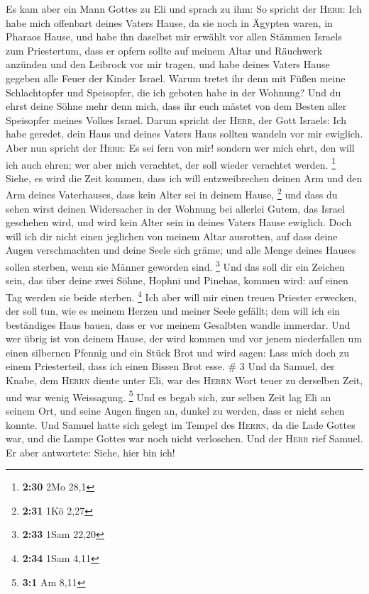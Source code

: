  Es kam aber ein Mann Gottes zu Eli und sprach zu ihm: So
spricht der \textsc{Herr}: Ich habe mich offenbart deines Vaters Hause,
da sie noch in Ägypten waren, in Pharaos Hause,  und habe
ihn daselbst mir erwählt vor allen Stämmen Israels zum Priestertum, dass
er opfern sollte auf meinem Altar und Räuchwerk anzünden und den
Leibrock vor mir tragen, und habe deines Vaters Hause gegeben alle Feuer
der Kinder Israel.  Warum tretet ihr denn mit Füßen meine
Schlachtopfer und Speisopfer, die ich geboten habe in der Wohnung? Und
du ehrst deine Söhne mehr denn mich, dass ihr euch mästet von dem Besten
aller Speisopfer meines Volkes Israel.  Darum spricht der
\textsc{Herr}, der Gott Israels: Ich habe geredet, dein Haus und deines
Vaters Haus sollten wandeln vor mir ewiglich. Aber nun spricht der
\textsc{Herr}: Es sei fern von mir! sondern wer mich ehrt, den will ich
auch ehren; wer aber mich verachtet, der soll wieder verachtet werden.
\footnote{\textbf{2:30} 2Mo 28,1}  Siehe, es wird die
Zeit kommen, dass ich will entzweibrechen deinen Arm und den Arm deines
Vaterhauses, dass kein Alter sei in deinem Hause, \footnote{\textbf{2:31}
  1Kö 2,27}  und dass du sehen wirst deinen Widersacher
in der Wohnung bei allerlei Gutem, das Israel geschehen wird, und wird
kein Alter sein in deines Vaters Hause ewiglich.  Doch
will ich dir nicht einen jeglichen von meinem Altar ausrotten, auf dass
deine Augen verschmachten und deine Seele sich gräme; und alle Menge
deines Hauses sollen sterben, wenn sie Männer geworden sind. \footnote{\textbf{2:33}
  1Sam 22,20}  Und das soll dir ein Zeichen sein, das
über deine zwei Söhne, Hophni und Pinehas, kommen wird: auf einen Tag
werden sie beide sterben. \footnote{\textbf{2:34} 1Sam 4,11}
 Ich aber will mir einen treuen Priester erwecken, der
soll tun, wie es meinem Herzen und meiner Seele gefällt; dem will ich
ein beständiges Haus bauen, dass er vor meinem Gesalbten wandle
immerdar.  Und wer übrig ist von deinem Hause, der wird
kommen und vor jenem niederfallen um einen silbernen Pfennig und ein
Stück Brot und wird sagen: Lass mich doch zu einem Priesterteil, dass
ich einen Bissen Brot esse. \# 3  Und da Samuel, der
Knabe, dem \textsc{Herrn} diente unter Eli, war des \textsc{Herrn} Wort
teuer zu derselben Zeit, und war wenig Weissagung. \footnote{\textbf{3:1}
  Am 8,11}  Und es begab sich, zur selben Zeit lag Eli an
seinem Ort, und seine Augen fingen an, dunkel zu werden, dass er nicht
sehen konnte.  Und Samuel hatte sich gelegt im Tempel des
\textsc{Herrn}, da die Lade Gottes war, und die Lampe Gottes war noch
nicht verloschen.  Und der \textsc{Herr} rief Samuel. Er
aber antwortete: Siehe, hier bin ich!

